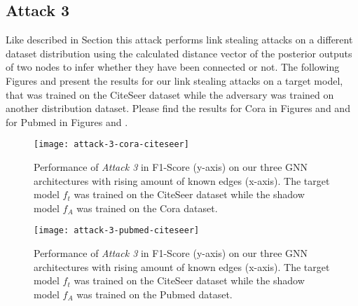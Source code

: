         \subsection*{Attack 3}
            Like described in Section  this attack performs link stealing attacks on a different dataset distribution using the calculated distance vector of the posterior outputs of two nodes to infer whether they have been connected or not. 
            The following Figures  and  present the results for our link stealing attacks on a target model, that was trained on the CiteSeer dataset while the adversary was trained on another distribution dataset.
            Please find the results for Cora in Figures  and  and for Pubmed in Figures  and .

            \begin{figure}[h]
                \begin{center}
                    \texttt{[image: attack-3-cora-citeseer]}
                    \caption[Attack 3 - $D_{f_t} = CiteSeer$ and $D_A = Cora$]{Performance of \emph{Attack 3} in F1-Score (y-axis) on our three GNN architectures with rising amount of known edges (x-axis). The target model $f_t$ was trained on the CiteSeer dataset while the shadow model $f_A$ was trained on the Cora dataset.}
                    \label{figure:eval-att3-cora-citeseer}
                \end{center}
            \end{figure}

            \begin{figure}[h]
                \begin{center}
                    \texttt{[image: attack-3-pubmed-citeseer]}
                    \caption[Attack 3 - $D_{f_t} = CiteSeer$ and $D_A = Pubmed$]{Performance of \emph{Attack 3} in F1-Score (y-axis) on our three GNN architectures with rising amount of known edges (x-axis). The target model $f_t$ was trained on the CiteSeer dataset while the shadow model $f_A$ was trained on the Pubmed dataset.}
                    \label{figure:eval-att3-pubmed-citeseer}
                \end{center}
            \end{figure}

